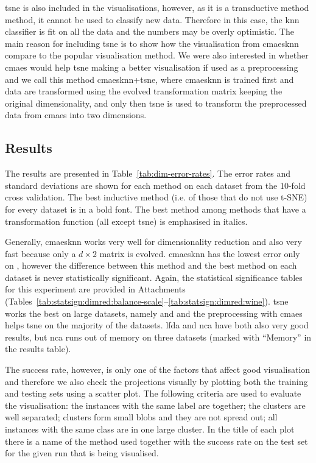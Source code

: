 \documentclass[12pt,a4paper]{report}
\begin{document}
\ac{tsne} is also included in the visualisations, however, as it is a transductive method method, it cannot be used to classify new data. Therefore in this case, the \ac{knn} classifier is fit on all the data and the numbers may be overly optimistic. The main reason for including \ac{tsne} is to show how the visualisation from \ac{cmaesknn} compare to the popular visualisation method. We were also interested in whether \ac{cmaes} would help \ac{tsne} making a better visualisation if used as a preprocessing and we call this method \ac{cmaesknn}+\ac{tsne}, where \ac{cmaesknn} is trained first and data are transformed using the evolved transformation matrix keeping the original dimensionality, and only then \ac{tsne} is used to transform the preprocessed data from \ac{cmaes} into two dimensions.

\subsection{Results}

The results are presented in Table~\ref{tab:dim-error-rates}. The error rates and standard deviations are shown for each method on each dataset from the 10-fold cross validation. The best inductive method (i.e. of those that do not use t-SNE) for every dataset is in a bold font. The best method among methods that have a transformation function (all except \ac{tsne}) is emphasised in italics.

Generally, \ac{cmaesknn} works very well for dimensionality reduction and also very fast because only a $d\times2$ matrix is evolved. \ac{cmaesknn} has the lowest error only on , however the difference between this method and the best method on each dataset is never statistically significant. Again, the statistical significance tables for this experiment are provided in Attachments (Tables~\ref{tab:statsign:dimred:balance-scale}--\ref{tab:statsign:dimred:wine}). \ac{tsne} works the best on large datasets, namely  and  and the preprocessing with \ac{cmaes} helps \ac{tsne} on the majority of the datasets. \ac{lfda} and \ac{nca} have both also very good results, but \ac{nca} runs out of memory on three datasets (marked with ``Memory'' in the results table).



The success rate, however, is only one of the factors that affect good visualisation and therefore we also check the projections visually by plotting both the training and testing sets using a scatter plot. The following criteria are used to evaluate the visualisation: the instances with the same label are together; the clusters are well separated; clusters form small blobs and they are not spread out; all instances with the same class are in one large cluster. In the title of each plot there is a name of the method used together with the success rate on the test set for the given run that is being visualised.
\end{document}
